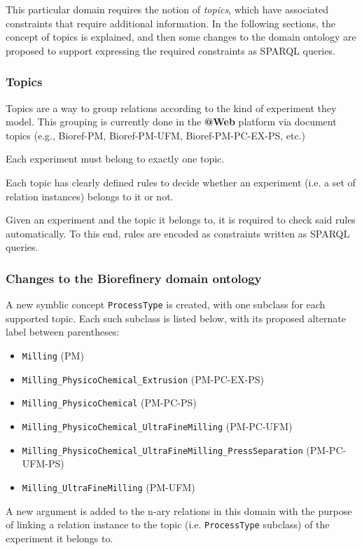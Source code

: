 \documentclass[a4paper, 10pt]{article}
\makeatletter
\newcommand{\atweb}{\textbf{@Web}\xspace}
\newcommand{\code}[1]{\texttt{#1}}
\makeatother
\begin{document}
This particular domain requires the notion of \textit{topics}, which have
associated constraints that require additional information. In the following
sections, the concept of topics is explained, and then some changes to the
domain ontology are proposed to support expressing the required constraints as
SPARQL queries.

\subsubsection{Topics}

Topics are a way to group relations according to the kind of experiment they
model. This grouping is currently done in the \atweb platform via document
topics (e.g., Bioref-PM, Bioref-PM-UFM, Bioref-PM-PC-EX-PS, etc.)

Each experiment must belong to exactly one topic.

Each topic has clearly defined rules to decide whether an experiment (i.e. a
set of relation instances) belongs to it or not.

Given an experiment and the topic it belongs to, it is required to check said
rules automatically. To this end, rules are encoded as constraints written as
SPARQL queries.

\subsubsection{Changes to the Biorefinery domain ontology}

A new symblic concept \code{ProcessType} is created, with one subclass for each
supported topic. Each such subclass is listed below, with its proposed
alternate label between parentheses:

\begin{itemize}
  \item \code{Milling} (PM)
  \item \code{Milling\_PhysicoChemical\_Extrusion} (PM-PC-EX-PS)
  \item \code{Milling\_PhysicoChemical} (PM-PC-PS)
  \item \code{Milling\_PhysicoChemical\_UltraFineMilling} (PM-PC-UFM)
  \item \code{Milling\_PhysicoChemical\_UltraFineMilling\_PressSeparation}
  (PM-PC-UFM-PS)
  \item \code{Milling\_UltraFineMilling} (PM-UFM)
\end{itemize}

A new argument is added to the n-ary relations in this domain with the purpose
of linking a relation instance to the topic (i.e. \code{ProcessType} subclass)
of the experiment it belongs to.
\end{document}
